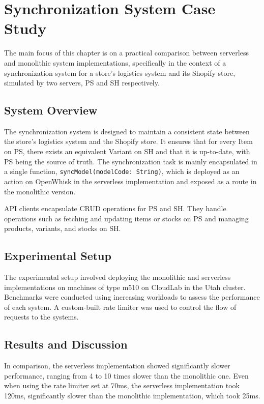 \chapter{Synchronization System Case Study}
\label{chap:synchronization}

The main focus of this chapter is on a practical comparison between serverless and monolithic system implementations, specifically in the context of a synchronization system for a store's logistics system and its Shopify store, simulated by two servers, PS and SH respectively.

\section{System Overview}

The synchronization system is designed to maintain a consistent state between the store's logistics system and the Shopify store. It ensures that for every Item on PS, there exists an equivalent Variant on SH and that it is up-to-date, with PS being the source of truth. The synchronization task is mainly encapsulated in a single function, \texttt{syncModel(modelCode: String)}, which is deployed as an action on OpenWhisk in the serverless implementation and exposed as a route in the monolithic version.

API clients encapsulate CRUD operations for PS and SH. They handle operations such as fetching and updating items or stocks on PS and managing products, variants, and stocks on SH. 

\section{Experimental Setup}

The experimental setup involved deploying the monolithic and serverless implementations on machines of type m510 on CloudLab in the Utah cluster. Benchmarks were conducted using increasing workloads to assess the performance of each system. A custom-built rate limiter was used to control the flow of requests to the systems.

\section{Results and Discussion}

In comparison, the serverless implementation showed significantly slower performance, ranging from 4 to 10 times slower than the monolithic one. Even when using the rate limiter set at 70ms, the serverless implementation took 120ms, significantly slower than the monolithic implementation, which took 25ms.


